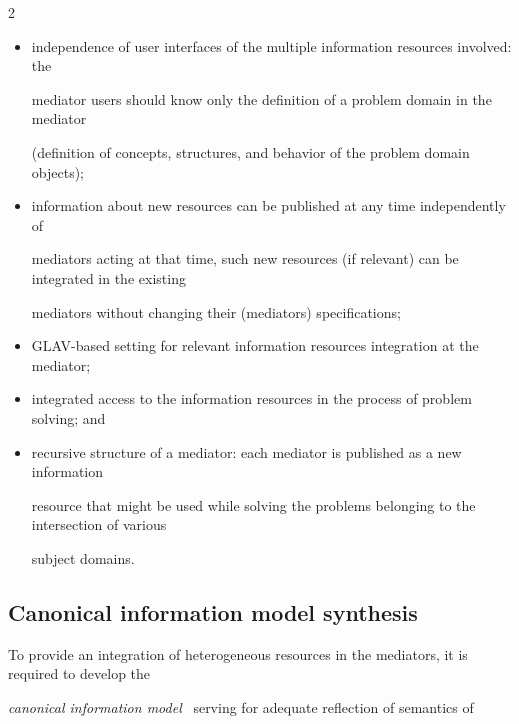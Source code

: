 \begin{multicols}{2}
\begin{itemize}
community;\\[-9pt] 


\item independence of user interfaces of the multiple information resources involved: the 


mediator users should know only the definition of a problem domain in the mediator 


(definition of concepts, structures, and behavior of the problem domain objects);\\[-9pt]


\item information about new resources can be published at any time independently of 


mediators acting at that time, such new resources (if relevant) can be integrated in the existing 


mediators without changing their (mediators) specifications;\\[-9pt]


\item GLAV-based setting for relevant information resources integration at the mediator;\\[-9pt] 


\item integrated access to the information resources in the process of problem solving; and\\[-9pt]


\item recursive structure of a mediator: each mediator is published as a new information 


resource that might be used while solving the problems belonging to the intersection of various 


subject domains.


\end{itemize}





\subsection{Canonical information model synthesis}





\noindent


To provide an integration of heterogeneous resources in the mediators, it is required to develop the 


\textit{canonical information model}~\cite{3kal} serving for adequate reflection of semantics of 



\end{multicols}
